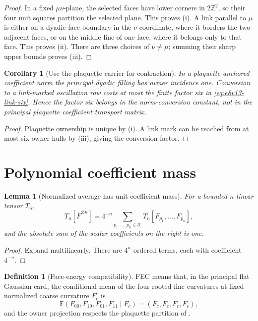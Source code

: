 \documentclass[11pt,oneside]{book}
\newtheorem{lemma}[theorem]{Lemma}
\newtheorem{corollary}[theorem]{Corollary}
\theoremstyle{definition}
\newtheorem{definition}[theorem]{Definition}
\theoremstyle{remark}
\begin{document}
\begin{proof}
In a fixed \(\mu\nu\)-plane, the selected faces have lower corners in
\(2\mathbb Z^2\), so their four unit squares partition the selected
plane.  This proves (i).  A link parallel to \(\mu\) is either on a
dyadic face boundary in the \(\nu\) coordinate, where it borders the
two adjacent faces, or on the middle line of one face, where it
belongs only to that face.  This proves (ii).  There are three choices
of \(\nu\ne\mu\); summing their sharp upper bounds proves (iii).
\end{proof}

\begin{corollary}[Use the plaquette carrier for contraction]
\label{cor:e8v13-carrier}
In a plaquette-anchored coefficient norm the principal dyadic filling
has owner incidence one.  Conversion to a link-marked oscillation row
costs at most the finite factor six in
\eqref{eq:e8v13-link-six}.  Hence the factor six belongs in the
norm-conversion constant, not in the principal plaquette coefficient
transport matrix.
\end{corollary}

\begin{proof}
Plaquette ownership is unique by
(i).  A link mark can be reached from at
most six owner hulls by (iii), giving the conversion factor.
\end{proof}

\section{Polynomial coefficient mass}
\label{sec:e8v13-polynomial}

\begin{lemma}[Normalized average has unit coefficient mass]
\label{lem:e8v13-unit-mass}
For a bounded \(n\)-linear tensor \(T_n\),
\[
 T_n[\overline F^{\otimes n}]
 =
 4^{-n}\sum_{p_1,\ldots,p_n\in{\mathcal S}_\square}
 T_n[F_{p_1},\ldots,F_{p_n}],                       \label{eq:e8v13-expansion}
\]
and the absolute sum of the scalar coefficients on the right is one.
\end{lemma}

\begin{proof}
Expand multilinearly.  There are \(4^n\) ordered terms, each with
coefficient \(4^{-n}\).
\end{proof}

\begin{definition}[Face-energy compatibility]
\label{def:e8v13-energy-compatible}
FEC means that, in the principal flat Gaussian card, the conditional
mean of the four rooted fine curvatures at fixed normalized coarse
curvature \(F_c\) is
\[
 \mathbb E(F_{00},F_{10},F_{01},F_{11}\mid F_c)
 =(F_c,F_c,F_c,F_c),                                \label{eq:e8v13-FEC}
\]
and the owner projection respects the plaquette partition of
.
\end{definition}
\end{document}
